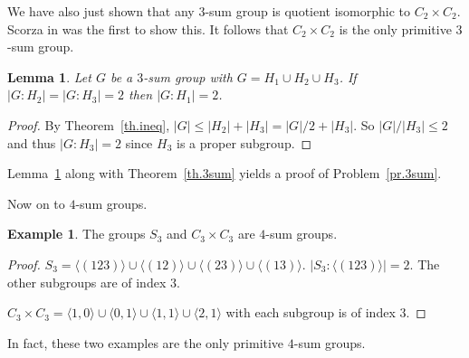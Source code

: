 \documentclass[12pt]{amsart}
\newtheorem{lemma}[theorem]{Lemma}
\theoremstyle{definition}
\newtheorem{example}[theorem]{Example}
\theoremstyle{remark}
\begin{document}
We have also just shown that any \( 3 \)-sum group is quotient isomorphic to \( C_2 \times C_2 \).  Scorza in \cite{GZa91} was the first to show this.  It follows that \( C_2 \times C_2 \) is the only primitive \( 3 \)-sum group.

\begin{lemma}
\label{lm.3sum}
Let \( G \) be a \( 3 \)-sum group with \( G = H_1 \cup H_2 \cup H_3 \).  If \( |G:H_2| = |G:H_3| = 2 \) then \( |G:H_1| = 2 \).
\end{lemma}
\begin{proof}
By Theorem~\ref{th.ineq}, \( |G| \leq |H_2| + |H_3| = |G|/2 + |H_3| \).  So \( |G|/|H_3| \leq 2 \) and thus \( |G:H_3| = 2 \) since \( H_3 \) is a proper subgroup.
\end{proof}

Lemma~\ref{lm.3sum} along with Theorem~\ref{th.3sum} yields a proof of Problem~\ref{pr.3sum}.

Now on to \(4\)-sum groups.

\begin{example}
The groups \(S_3\) and \( C_3 \times C_3 \) are \(4\)-sum groups.
\end{example}
\begin{proof}
\(S_3 = \langle (1 2 3) \rangle \cup \langle (1 2) \rangle \cup \langle (2 3) \rangle \cup \langle (1 3) \rangle \).  \(|S_3 : \langle (1 2 3) \rangle| = 2\).  The other subgroups are of index \(3\).

\( C_3 \times C_3 = \langle 1,0 \rangle \cup \langle 0,1 \rangle \cup \langle 1,1 \rangle \cup \langle 2,1 \rangle \) with each subgroup is of index \(3\).
\end{proof}

In fact, these two examples are the only primitive \( 4 \)-sum groups.
\end{document}
